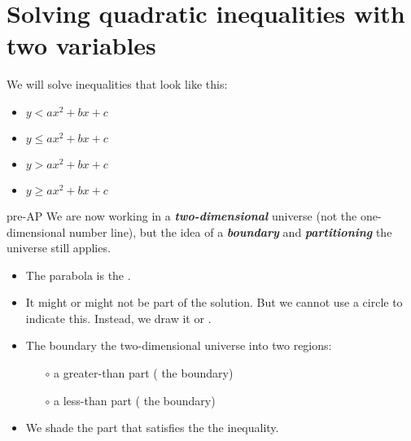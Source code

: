 \section*{Solving quadratic inequalities with two variables}

We will solve inequalities that look like this:

\begin{center}
\begin{minipage}{0.4\textwidth}
    \begin{itemize}[itemsep=0in]
        \item $y <    ax^2 + bx + c$
        \item $y \leq ax^2 + bx + c$
    \end{itemize}
\end{minipage}
\begin{minipage}{0.4\textwidth}
    \begin{itemize}[itemsep=0in]
        \item $y >    ax^2 + bx + c$
        \item $y \geq ax^2 + bx + c$
    \end{itemize}
\end{minipage}
\end{center}



\begin{taggedblock}{pre-AP}
    We are now working in a {\bfseries\itshape two-dimensional} universe
    (not the one-dimensional number line),
    but the idea of a {\bfseries\itshape boundary} and 
    {\bfseries\itshape partitioning} the universe still applies.

    \begin{center}
        \begin{tcolorbox}[width=6in]
            \begin{itemize}
                \item The parabola is the .
                \item It might or might not be part of the solution. 
                But we cannot use a circle to indicate this.
                Instead, we draw it  or .
                \item The boundary  the two-dimensional universe into two regions:
                    \begin{itemize}
                        \item[$\circ$] a greater-than part ( the boundary)
                        \item[$\circ$] a less-than part ( the boundary)
                    \end{itemize}
                \item We shade the part that satisfies the the inequality.
            \end{itemize}
        \end{tcolorbox}
    \end{center}
\end{taggedblock}



